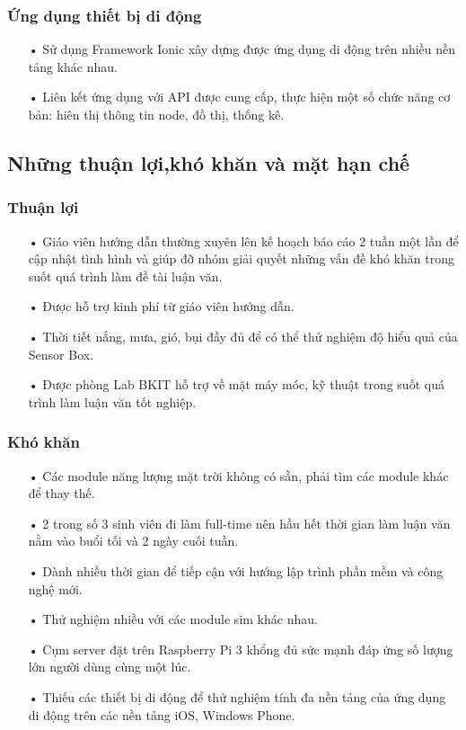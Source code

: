\subsubsection*{Ứng dụng thiết bị di động}
\begin{itemize}
\item[•] Sử dụng Framework Ionic xây dựng được ứng dụng di động trên nhiều nền tảng khác nhau.
\item[•] Liên kết ứng dụng với API được cung cấp, thực hiện một số chức năng cơ bản: hiên thị thông tin node, đồ thị, thống kê.
\end{itemize}

\subsection{Những thuận lợi,khó khăn và mặt hạn chế}
\subsubsection*{Thuận lợi}
\begin{itemize}
\item[•] Giáo viên hướng dẫn thường xuyên lên kế hoạch báo cáo 2 tuần một lần để cập nhật tình hình và giúp đỡ nhóm giải quyết những vấn đề khó khăn trong suốt quá trình làm đề tài luận văn.
\item[•] Được hỗ trợ kinh phí từ giáo viên hướng dẫn.
\item[•] Thời tiết nắng, mưa, gió, bụi đầy đủ để có thể thử nghiệm độ hiểu quả của Sensor Box.
\item[•] Được phòng Lab BKIT hỗ trợ về mặt máy móc, kỹ thuật trong suốt quá trình làm luận văn tốt nghiệp.
\end{itemize}

\subsubsection*{Khó khăn}
\begin{itemize}
\item[•] Các module năng lượng mặt trời không có sẵn, phải tìm các module khác để thay thế.
\item[•] 2 trong số 3 sinh viên đi làm full-time nên hầu hết thời gian làm luận văn nằm vào buổi tối và 2 ngày cuối tuần.
\item[•] Dành nhiều thời gian để tiếp cận với hướng lập trình phần mềm và công nghệ mới.
\item[•] Thử nghiệm nhiều với các module sim khác nhau.
\item[•] Cụm server đặt trên Raspberry Pi 3 khổng đủ sức mạnh đáp ứng số lượng lớn người dùng cùng một lúc.
\item[•] Thiếu các thiết bị di động để thử nghiệm tính đa nền tảng của ứng dụng di động trên các nền tảng iOS, Windows Phone.
\end{itemize}
